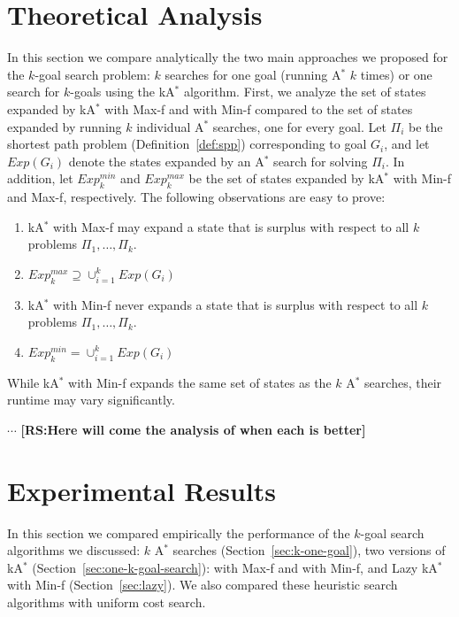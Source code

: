 \documentclass{aicom2e}
\newcommand{\kgs}{$k$-goal search}
\newcommand{\astar}{A$^*$}
\newcommand{\kastar}{kA$^*$}
\newcommand{\minf}{Min-f}
\newcommand{\maxf}{Max-f}
\newcommand{\roni}[1]{\textbf{[RS:#1]}}
\begin{document}
\section{Theoretical Analysis}
In this section we compare analytically the two main approaches we proposed for the \kgs{} problem: $k$ searches for one goal (running \astar{} $k$ times) or one search for $k$-goals using the \kastar{} algorithm. 
First, we analyze the set of states expanded by \kastar{} with \maxf{} and with \minf{} compared to the set of states expanded by running $k$ individual \astar{} searches, one for every goal. 
Let $\Pi_i$ be the shortest path problem (Definition~\ref{def:spp}) corresponding to goal $G_i$, 
and let $Exp(G_i)$ denote the states expanded by an \astar{} search for solving $\Pi_i$. 
In addition, let $Exp_{k}^{min}$ and $Exp_{k}^{max}$ be the set of states expanded by \kastar{} with \minf{} and \maxf{}, respectively. 
The following observations are easy to prove:
	\begin{enumerate}
	\item \kastar{} with \maxf{} may expand a state that is surplus with respect to all $k$ problems $\Pi_1,\ldots,\Pi_k$. 
	\item $Exp_k^{max} \supseteq \cup_{i=1}^k Exp(G_i)$
	\item \kastar{} with \minf{} never expands a state that is surplus with respect to all $k$ problems $\Pi_1,\ldots,\Pi_k$. 
	\item $Exp_k^{min} = \cup_{i=1}^k Exp(G_i)$
\end{enumerate}

While \kastar{} with \minf{} expands the same set of states as the $k$ \astar{} searches, 
their runtime may vary significantly. 

$\cdots$
\roni{Here will come the analysis of when each is better}






\section{Experimental Results}

In this section we compared empirically the performance of the \kgs{} algorithms we discussed: $k$ \astar{} searches (Section~\ref{sec:k-one-goal}), two versions of \kastar{} (Section~\ref{sec:one-k-goal-search}): with \maxf{} and with \minf{}, and Lazy \kastar{} with \minf{} (Section~\ref{sec:lazy}). We also compared these heuristic search algorithms with uniform cost search. 
\end{document}
